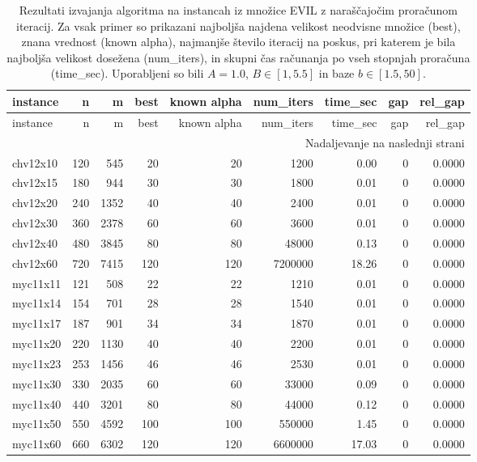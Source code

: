 {\setlength{\LTcapwidth}{\textwidth}
\begin{longtable}{lrrrrrrrr}
\caption{Rezultati izvajanja algoritma na instancah iz množice EVIL z naraščajočim proračunom iteracij. Za vsak primer so prikazani najboljša najdena velikost neodvisne množice (best), znana vrednost (known alpha), najmanjše število iteracij na poskus, pri katerem je bila najboljša velikost dosežena (num\_iters), in skupni čas računanja po vseh stopnjah proračuna (time\_sec). Uporabljeni so bili $A = 1.0$, $B \in [1, 5.5]$ in baze $b \in [1.5, 50]$.} \label{tab:results_budget_tiers_EVIL} \\
\toprule
instance & n & m & best & known alpha & num\_iters & time\_sec & gap & rel\_gap \\
\midrule
\endfirsthead
\toprule
instance & n & m & best & known alpha & num\_iters & time\_sec & gap & rel\_gap \\
\midrule
\endhead
\midrule
\multicolumn{9}{r}{Nadaljevanje na naslednji strani} \\
\endfoot
\bottomrule
\endlastfoot
chv12x10 & 120 & 545 & 20 & 20 & 1200 & 0.00 & 0 & 0.0000 \\
chv12x15 & 180 & 944 & 30 & 30 & 1800 & 0.01 & 0 & 0.0000 \\
chv12x20 & 240 & 1352 & 40 & 40 & 2400 & 0.01 & 0 & 0.0000 \\
chv12x30 & 360 & 2378 & 60 & 60 & 3600 & 0.01 & 0 & 0.0000 \\
chv12x40 & 480 & 3845 & 80 & 80 & 48000 & 0.13 & 0 & 0.0000 \\
chv12x60 & 720 & 7415 & 120 & 120 & 7200000 & 18.26 & 0 & 0.0000 \\
myc11x11 & 121 & 508 & 22 & 22 & 1210 & 0.01 & 0 & 0.0000 \\
myc11x14 & 154 & 701 & 28 & 28 & 1540 & 0.01 & 0 & 0.0000 \\
myc11x17 & 187 & 901 & 34 & 34 & 1870 & 0.01 & 0 & 0.0000 \\
myc11x20 & 220 & 1130 & 40 & 40 & 2200 & 0.01 & 0 & 0.0000 \\
myc11x23 & 253 & 1456 & 46 & 46 & 2530 & 0.01 & 0 & 0.0000 \\
myc11x30 & 330 & 2035 & 60 & 60 & 33000 & 0.09 & 0 & 0.0000 \\
myc11x40 & 440 & 3201 & 80 & 80 & 44000 & 0.12 & 0 & 0.0000 \\
myc11x50 & 550 & 4592 & 100 & 100 & 550000 & 1.45 & 0 & 0.0000 \\
myc11x60 & 660 & 6302 & 120 & 120 & 6600000 & 17.03 & 0 & 0.0000 \\

\end{longtable}}
